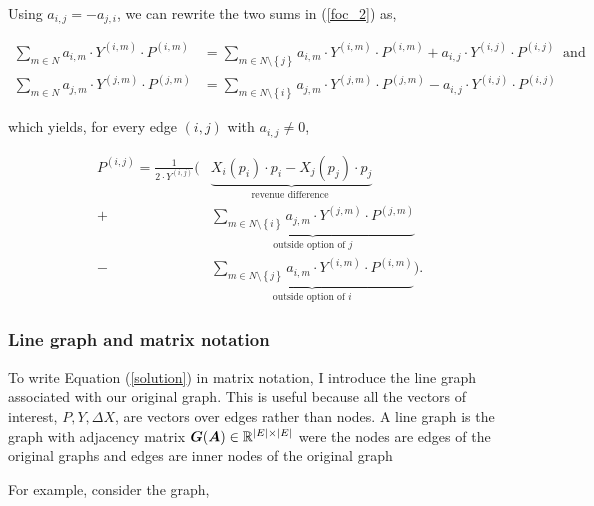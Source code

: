 \documentclass[american]{scrartcl}
\newcommand{\R}{\mathbb{R}}
\newcommand{\matr}[1]{\bm{#1}}
\newcommand{\set}[1]{\left\{#1\right\}}
\DeclarePairedDelimiter\abs{\lvert}{\rvert}%
\begin{document}
Using $a_{i, j} = - a_{j, i}$, we can rewrite the two sums in (\ref{foc_2}) as,

\begin{equation}
	\begin{split}
		\sum_{m \in N} a_{i, m} \cdot Y^{(i, m)} \cdot P^{(i, m)} &= \sum_{m \in N \setminus \set{j}}  a_{i, m} \cdot Y^{(i, m)} \cdot P^{(i, m)} + a_{i, j} \cdot Y^{(i, j)} \cdot P^{(i, j)} \ \text{ and }\\
		\sum_{m \in N} a_{j, m} \cdot Y^{(j, m)} \cdot P^{(j, m)} &=  \sum_{m \in N \setminus \set{i}}  a_{j, m} \cdot Y^{(j, m)} \cdot P^{(j, m)} - a_{i, j} \cdot Y^{(i, j)} \cdot P^{(i, j)}
	\end{split}
\end{equation}

which yields, for every edge $(i, j)$ with $ a_{i, j} \neq 0$,

\begin{equation} \label{solution}
	\begin{split}
		P^{(i, j)} = \frac{1}{2\cdot Y^{(i, j)}} \Biggl( &\underbrace{X_i(p_i)\cdot p_i - X_j(p_j)\cdot p_j}_{\text{revenue difference }}
		\\  + &\underbrace{\sum_{m\in N\setminus \set{i}} a_{j, m} \cdot Y^{(j, m)} \cdot P^{(j, m)}}_{\text{outside option of } j}
		\\ - & \underbrace{\sum_{m \in N\setminus \set{j}} a_{i, m} \cdot Y^{(i, m)} \cdot P^{(i, m)}}_{\text{outside option of } i} \Biggr).
	\end{split}
\end{equation}

\subsubsection{Line graph and matrix notation}


To write Equation (\ref{solution}) in matrix notation, I introduce the line graph associated with our original graph. This is useful because all the vectors of interest, $P, Y, \Delta X$, are vectors over edges rather than nodes. A line graph is the graph with adjacency matrix $\matr{G}(\matr{A}) \in \R^{\abs{E} \times \abs{E}}$ were the nodes are edges of the original graphs and edges are inner nodes of the original graph

For example, consider the graph,
\end{document}
